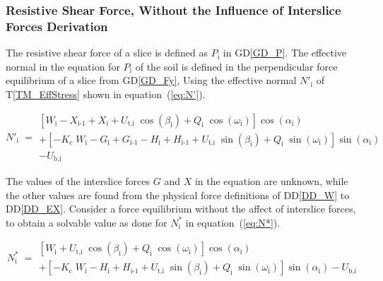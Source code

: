 \documentclass[12pt]{article}
\newcommand{\tref}[1]{T\ref{#1}}
\newcommand{\ddref}[1]{DD\ref{#1}}
\newcommand{\dref}[1]{GD\ref{#1}}
\begin{document}

\subsubsection*{Resistive Shear Force, Without the
  Influence of Interslice Forces Derivation}

\noindent
The resistive shear force of a slice is defined as $P_\text{i}$ in
\dref{GD_P}.  The effective normal in the equation for $P_\text{i}$ of
the soil is defined in the perpendicular force equilibrium of a slice
from \dref{GD_Fy}, Using the effective normal $N'_\text{i}$ of
\tref{TM_EffStress} shown in equation~(\ref{eq:N'}).

\begin{equation} \label{eq:N'}
 N'_{\text{i}} \; = \begin{array}{l}
   \left[ W_{\text{i}} - X_{\text{i-1}} + X_{\text{i}} +
     {U_{\text{t,i}}}\;{\cos\left(\beta_{\text{i}}\right)} +
     Q_{\text{i}}\;{\cos\left(\omega_{\text{i}}\right)}
     \right]\cos\left(\alpha_{\text{i}}\right) \\ + \left[
     {-K_{\text{c}}}\;{W_{\text{i}}} - G_{\text{i}} + G_{\text{i-1}} -
     H_{\text{i}} + H_{\text{i-1}} +
     {U_{\text{t,i}}}\;{\sin\left(\beta_{\text{i}}\right)} +
     Q_{\text{i}}\;{\sin\left(\omega_{\text{i}}\right)}
     \right]\sin\left(\alpha_{\text{i}}\right) \\ -
   U_{\text{b,i}} \end{array}
 \end{equation}

\noindent
The values of the interslice forces $G$ and $X$ in the equation are
unknown, while the other values are found from the physical force
definitions of \ddref{DD_W} to \ddref{DD_EX}.  Consider a force
equilibrium without the affect of interslice
forces, to obtain a solvable value as done for $N^*_\text{i}$ in
equation~(\ref{eq:N*}).

\begin{equation} \label{eq:N*}
 N^*_{\text{i}} \; = \begin{array}{l}
   \left[ W_{\text{i}} +
     {U_{\text{t,i}}}\;{\cos\left(\beta_{\text{i}}\right)} +
     Q_{\text{i}}\;{\cos\left(\omega_{\text{i}}\right)}
     \right]\cos\left(\alpha_{\text{i}}\right) \\ + \left[
     {-K_{\text{c}}}\;{W_{\text{i}}}- H_{\text{i}} + H_{\text{i-1}} +
     {U_{\text{t,i}}}\;{\sin\left(\beta_{\text{i}}\right)} +
     Q_{\text{i}}\;{\sin\left(\omega_{\text{i}}\right)}
     \right]\sin\left(\alpha_{\text{i}}\right) -
   U_{\text{b,i}} \end{array}
\end{equation}
\end{document}
